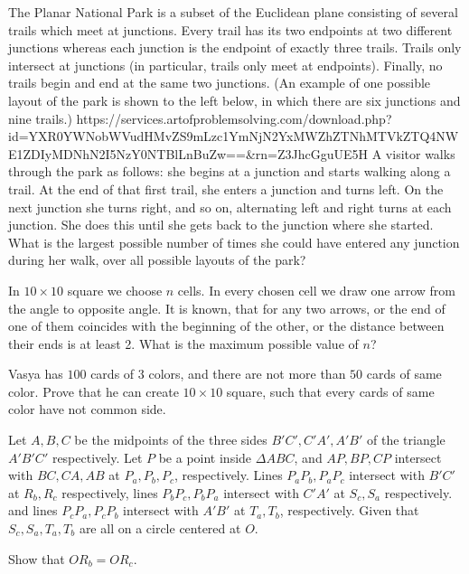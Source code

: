 \documentclass[11pt]{scrartcl}
\begin{document}
\begin{problem}[313143209359080]
The Planar National Park is a subset of the Euclidean plane consisting of several trails which meet at junctions. Every trail has its two endpoints at two different junctions whereas each junction is the endpoint of exactly three trails. Trails only intersect at junctions (in particular, trails only meet at endpoints). Finally, no trails begin and end at the same two junctions. (An example of one possible layout of the park is shown to the left below, in which there are six junctions and nine trails.)
https://services.artofproblemsolving.com/download.php?id=YXR0YWNobWVudHMvZS9mLzc1YmNjN2YxMWZhZTNhMTVkZTQ4NWE1ZDIyMDNhN2I5NzY0NTBlLnBuZw==&rn=Z3JhcGguUE5H
A visitor walks through the park as follows: she begins at a junction and starts walking along a trail. At the end of that first trail, she enters a junction and turns left. On the next junction she turns right, and so on, alternating left and right turns at each junction. She does this until she gets back to the junction where she started. What is the largest possible number of times she could have entered any junction during her walk, over all possible layouts of the park?
\end{problem}
\begin{problem}[5949258338135822858]
In $10\times 10$ square we choose $n$ cells. In every chosen cell we draw one arrow from the angle to opposite angle. It is known, that for any two arrows, or the end of one of them coincides with the beginning of the other, or
the distance between their ends is at least 2. What is the maximum possible value of $n$?
\end{problem}
\begin{problem}[122001240071629]
	Vasya has $100$ cards of $3$ colors, and there are not more than $50$ cards of same color. Prove that he can create $10\times 10$ square, such that every cards of same color have not common side.
\end{problem}
\begin{problem}[5261846980754565299]
	Let $A,B,C$ be the midpoints of the three sides $B'C', C'A', A'B'$ of the triangle $A'B'C'$ respectively. Let $P$ be a point inside $\Delta ABC$, and $AP,BP,CP$ intersect with $BC, CA, AB$ at $P_a,P_b,P_c$, respectively. Lines $P_aP_b, P_aP_c$ intersect with $B'C'$ at $R_b, R_c$ respectively, lines $P_bP_c, P_bP_a$ intersect with $C'A'$ at $S_c, S_a$ respectively. and lines $P_cP_a, P_cP_b$ intersect with $A'B'$ at $T_a, T_b$, respectively. Given that $S_c,S_a, T_a, T_b$ are all on a circle centered at $O$.

Show that $OR_b=OR_c$.
\end{problem}
\end{document}
